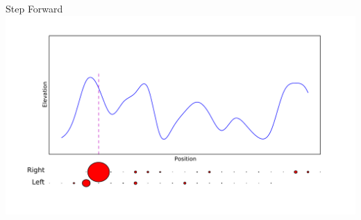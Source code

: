 \documentclass{beamer}
\begin{document}
\begin{frame}{Step Forward}
\centering
\includegraphics[width=\textwidth]{move2}\\
\end{frame}
\end{document}
